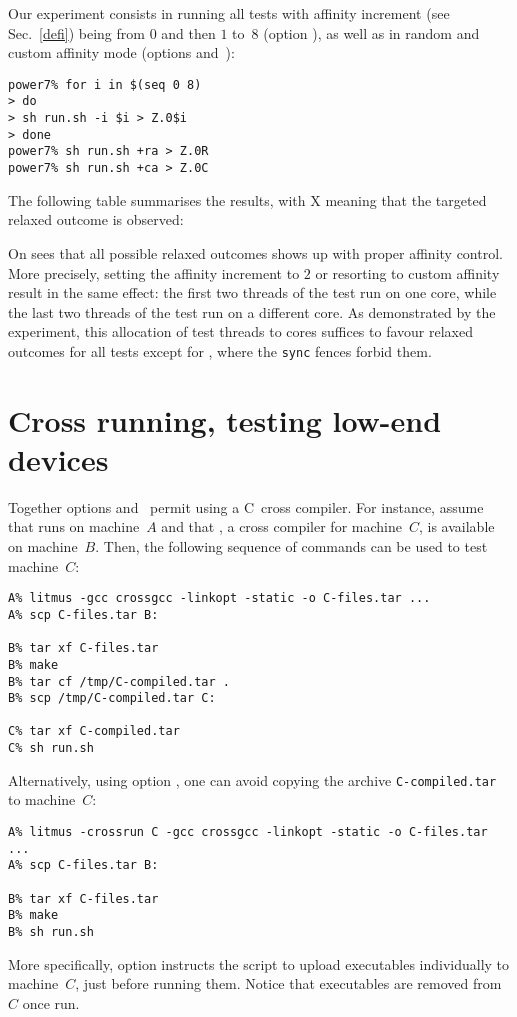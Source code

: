 Our experiment consists in running all tests
with affinity increment (see Sec.~\ref{defi}) being from $0$
and then $1$ to~$8$ (option ),
as well as in random and custom affinity mode
(options  and~):
\begin{verbatim}
power7% for i in $(seq 0 8)
> do
> sh run.sh -i $i > Z.0$i
> done
power7% sh run.sh +ra > Z.0R
power7% sh run.sh +ca > Z.0C

\end{verbatim}
The following table summarises the results, with X meaning that the targeted
relaxed outcome is observed:
\begin{center}\def\tstdir{tst-ppc}\let\handletest\xhandletest

\end{center}
On sees that all possible relaxed outcomes shows up with proper affinity
control. More precisely, setting the affinity increment to $2$ or resorting
to custom affinity result in the same effect:
the first two threads of the test run on one core, while the last two threads
of the test run on a different core.
As demonstrated by the experiment, this allocation of test threads to cores
suffices to favour relaxed outcomes for all tests except for
,
where the \texttt{sync} fences forbid them.


\section{Cross running, testing low-end devices}
Together \litmus{} options 
and~ permit using
a C~cross compiler. For instance, assume that 
runs on machine~$A$ and that , a cross compiler for machine~$C$,
is available on machine~$B$. Then, the following sequence of
commands can be used to test machine~$C$:
\begin{verbatim}
A% litmus -gcc crossgcc -linkopt -static -o C-files.tar ...
A% scp C-files.tar B:

B% tar xf C-files.tar
B% make
B% tar cf /tmp/C-compiled.tar .
B% scp /tmp/C-compiled.tar C:

C% tar xf C-compiled.tar
C% sh run.sh
\end{verbatim}
Alternatively, using option ,
one can avoid copying the archive \verb+C-compiled.tar+ to machine~$C$:
\begin{verbatim}
A% litmus -crossrun C -gcc crossgcc -linkopt -static -o C-files.tar ...
A% scp C-files.tar B:

B% tar xf C-files.tar
B% make
B% sh run.sh
\end{verbatim}
More specifically, option  instructs the 
script to upload executables individually to machine~$C$, just before running
them. Notice that executables are removed from~$C$ once run.

